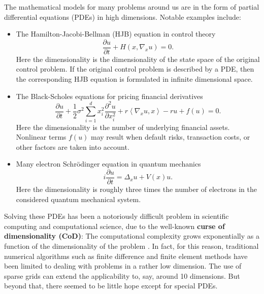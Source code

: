 \documentclass[12pt]{article}
\newcommand{\bi}{\begin{itemize}}
\newcommand{\ei}{\end{itemize}}
\theoremstyle{definition}
\newcommand{\bx}{{x}}
\begin{document}
The mathematical models for many problems around us are in the form of partial differential equations (PDEs) in high dimensions.
Notable examples include:
\bi
  \item The Hamilton-Jacobi-Bellman (HJB) equation in  control theory
  \begin{equation}
    \frac{ \partial u }{ \partial t } + H( \bx, \nabla_x u ) = 0 .
%
%
  \end{equation}
  Here  the dimensionality is the dimensionality of the state space of the original control problem. If the original control
  problem is described by a PDE, then the corresponding HJB equation is formulated in infinite dimensional space.
  \item The Black-Scholes equations for pricing financial derivatives
  \begin{equation}
    \frac{ \partial u }{ \partial t } + \frac12\sigma^2 \sum_{i=1}^d x_i^2\frac{\partial^2 u}{\partial x_i^2} + r \left< \nabla_x u , \bx \right> - r u + f(u) = 0 .
  \end{equation}
  Here the dimensionality is the number of underlying financial assets. 
  Nonlinear terms $f(u)$ may result when default risks, transaction costs, or other factors are taken into account.
  \item Many electron Schr\"odinger equation in quantum mechanics
\begin{equation}
i \frac{ \partial u }{ \partial t } =   \Delta_x u + V(\bx) u .
\end{equation}  
Here the dimensionality is roughly three times the number of electrons in the considered quantum mechanical system.
\ei

Solving these PDEs has been a  notoriously difficult problem in scientific computing and computational science,
due to the well-known {\bf curse of dimensionality (CoD)}: The computational complexity grows exponentially as a function
of the dimensionality of the problem \cite{Bellman1957}. In fact, for this reason, traditional numerical algorithms such as
finite difference and finite element methods have been limited to dealing with problems in a rather low dimension.
The use of sparse grids can extend the applicability to, say, around 10 dimensions.  But beyond that, there seemed to be
little hope except for special PDEs.
\end{document}

